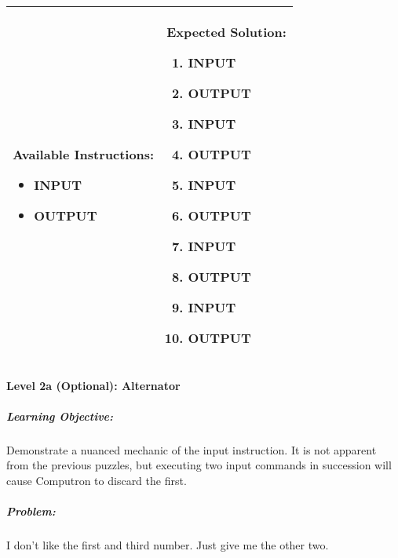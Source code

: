 \begin{center}
    \begin{tabular}{ | m{5cm} | m{9cm} | } 
        \hline
            \textbf{Available Instructions:} 
            \begin{itemize}
                \setlength\itemsep{-.35em}
                \item INPUT
                \item OUTPUT
            \end{itemize}& 
            \textbf{Expected Solution:} 
            \begin{enumerate}
                \setlength\itemsep{-.35em}
                \item INPUT
                \item OUTPUT
                \item INPUT
                \item OUTPUT
                \item INPUT
                \item OUTPUT
                \item INPUT
                \item OUTPUT
                \item INPUT
                \item OUTPUT
            \end{enumerate}
            \\
        \hline
    \end{tabular}
\end{center}


\paragraph{Level 2a (Optional): Alternator}
\subparagraph{Learning Objective:} Demonstrate a nuanced mechanic of the input instruction. It is not apparent from the previous puzzles, but executing two input commands in succession will cause Computron to discard the first.

\subparagraph{Problem:} I don't like the first and third number. Just give me the other two.

